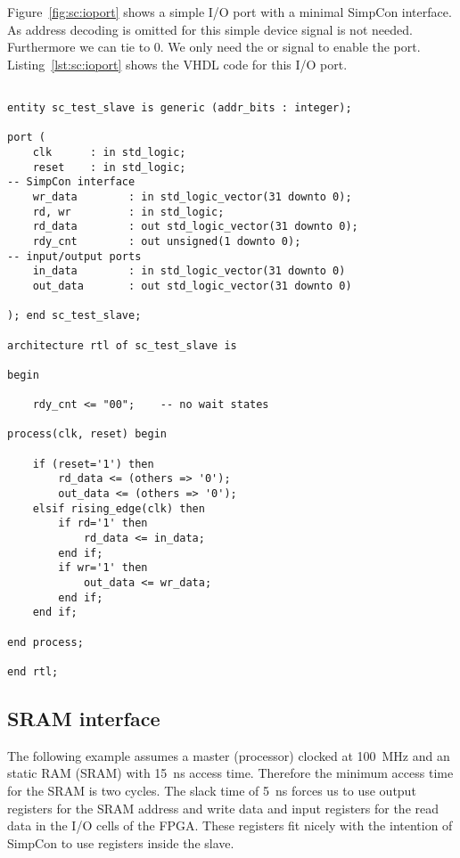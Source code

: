 Figure~\ref{fig:sc:ioport} shows a simple I/O port with a minimal
SimpCon interface. As address decoding is omitted for this simple
device signal  is not needed. Furthermore we can tie
 to 0. We only need the  or  signal
to enable the port. Listing~\ref{lst:sc:ioport} shows the VHDL code
for this I/O port.

\begin{lstlisting}[float,caption={VHDL source for the simple input/output port},
label=lst:sc:ioport]

entity sc_test_slave is generic (addr_bits : integer);

port (
    clk      : in std_logic;
    reset    : in std_logic;
-- SimpCon interface
    wr_data        : in std_logic_vector(31 downto 0);
    rd, wr         : in std_logic;
    rd_data        : out std_logic_vector(31 downto 0);
    rdy_cnt        : out unsigned(1 downto 0);
-- input/output ports
    in_data        : in std_logic_vector(31 downto 0)
    out_data       : out std_logic_vector(31 downto 0)

); end sc_test_slave;

architecture rtl of sc_test_slave is

begin

    rdy_cnt <= "00";    -- no wait states

process(clk, reset) begin

    if (reset='1') then
        rd_data <= (others => '0');
        out_data <= (others => '0');
    elsif rising_edge(clk) then
        if rd='1' then
            rd_data <= in_data;
        end if;
        if wr='1' then
            out_data <= wr_data;
        end if;
    end if;

end process;

end rtl;
\end{lstlisting}

\subsection{SRAM interface}

The following example assumes a master (processor) clocked at 100~MHz
and an static RAM (SRAM) with 15~ns access time. Therefore the
minimum access time for the SRAM is two cycles. The slack time of
5~ns forces us to use output registers for the SRAM address and write
data and input registers for the read data in the I/O cells of the
FPGA. These registers fit nicely with the intention of SimpCon to use
registers inside the slave.

